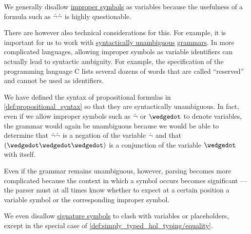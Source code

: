 \begin{remark}\label{rem:improper_symbols_and_parsing}
  We generally disallow \hyperref[con:improper_symbol]{improper symbols} as variables because the usefulness of a formula such as \( \dot{\neg} \dot{\neg} \) is highly questionable.

  There are however also technical considerations for this. For example, it is important for us to work with \hyperref[def:grammar_ambiguity]{syntactically unambiguous} \hyperref[def:formal_grammar]{grammars}. In more complicated languages, allowing improper symbols as variable identifiers can actually lead to syntactic ambiguity. For example, the specification \cite[\S 6.4.1]{ISO:9899:2018} of the programming language C lists several dozens of words that are called \enquote{reserved} and cannot be used as identifiers.

  We have defined the syntax of propositional formulas in \cref{def:propositional_syntax} so that they are syntactically unambiguous. In fact, even if we allow improper symbols such as \( \dot{\neg} \) or \( {\synwedge} \) to denote variables, the grammar would again be unambiguous because we would be able to determine that \( \dot{\neg} \dot{\neg} \) is a negation of the variable \( \dot{\neg} \) and that \( (\synwedge \synwedge \synwedge) \) is a conjunction of the variable \( {\synwedge} \) with itself.

  Even if the grammar remains unambiguous, however, parsing becomes more complicated because the context in which a symbol occurs becomes significant --- the parser must at all times know whether to expect at a certain position a variable symbol or the corresponding improper symbol.

  We even disallow \hyperref[con:logical_system_signature]{signature symbols} to clash with variables or placeholders, except in the special case of \cref{def:simply_typed_hol_typing/equality}.
\end{remark}


